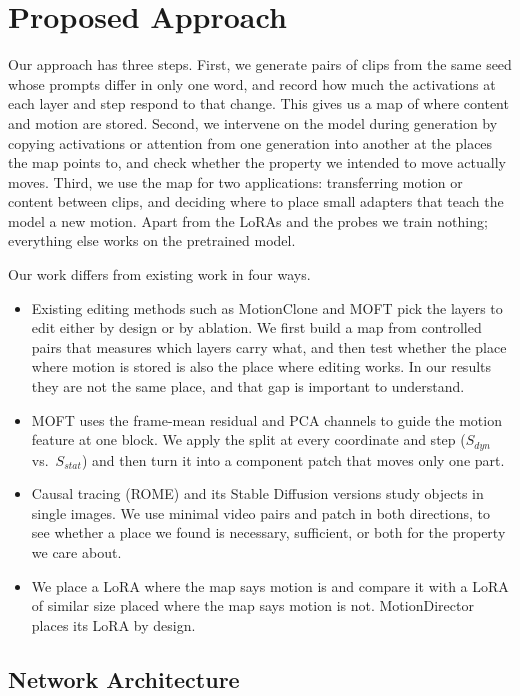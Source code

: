 \documentclass[twoside,english]{article}
\begin{document}
\section{Proposed Approach} \label{sec:our_proj}

Our approach has three steps. First, we generate pairs of clips from the same seed whose prompts
differ in only one word, and record how much the activations at each layer and step respond to that
change. This gives us a map of where content and motion are stored. Second, we intervene on the model
during generation by copying activations or attention from one generation into another at the places
the map points to, and check whether the property we intended to move actually moves. Third, we use
the map for two applications: transferring motion or content between clips, and deciding where to
place small adapters that teach the model a new motion. Apart from the LoRAs and the probes we train
nothing; everything else works on the pretrained model.

Our work differs from existing work in four ways.
\begin{itemize}
  \item Existing editing methods such as MotionClone and MOFT pick the layers to edit either by design
  or by ablation. We first build a map from controlled pairs that measures which layers carry what,
  and then test whether the place where motion is stored is also the place where editing works. In
  our results they are not the same place, and that gap is important to understand.
  \item MOFT uses the frame-mean residual and PCA channels to guide the motion feature at one block.
  We apply the split at every coordinate and step ($S_{dyn}$ vs.\ $S_{stat}$) and then turn it into a
  component patch that moves only one part.
  \item Causal tracing (ROME) and its Stable Diffusion versions study objects in single images. We use
  minimal video pairs and patch in both directions, to see whether a place we found is necessary,
  sufficient, or both for the property we care about.
  \item We place a LoRA where the map says motion is and compare it with a LoRA of similar size placed
  where the map says motion is not. MotionDirector places its LoRA by design.
\end{itemize}

\subsection{Network Architecture}
\end{document}
